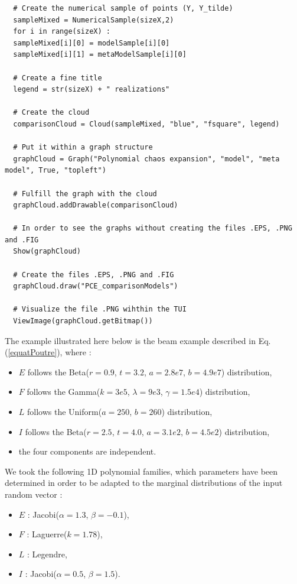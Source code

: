 \begin{lstlisting}
  # Create the numerical sample of points (Y, Y_tilde)
  sampleMixed = NumericalSample(sizeX,2)
  for i in range(sizeX) :
  sampleMixed[i][0] = modelSample[i][0]
  sampleMixed[i][1] = metaModelSample[i][0]

  # Create a fine title
  legend = str(sizeX) + " realizations"

  # Create the cloud
  comparisonCloud = Cloud(sampleMixed, "blue", "fsquare", legend)

  # Put it within a graph structure
  graphCloud = Graph("Polynomial chaos expansion", "model", "meta model", True, "topleft")

  # Fulfill the graph with the cloud
  graphCloud.addDrawable(comparisonCloud)

  # In order to see the graphs without creating the files .EPS, .PNG and .FIG
  Show(graphCloud)

  # Create the files .EPS, .PNG and .FIG
  graphCloud.draw("PCE_comparisonModels")

  # Visualize the file .PNG wihthin the TUI
  ViewImage(graphCloud.getBitmap())
\end{lstlisting}

\vspace*{0.1cm}

The example illustrated here below is the beam example described in Eq. (\ref{equatPoutre}), where :
\begin{itemize}
\item $E$ follows the Beta($r = 0.9$, $t = 3.2$, $a = 2.8e7$, $b = 4.9e7$) distribution,
\item $F$ follows the Gamma($k = 3e5$, $\lambda = 9e3$, $\gamma = 1.5e4$)  distribution,
\item $L$ follows the Uniform($a = 250$, $b=260$) distribution,
\item $I$ follows the Beta($r = 2.5$, $t = 4.0$, $a = 3.1e2$, $b = 4.5e2$) distribution,
\item the four components are independent.
\end{itemize}

We took the following 1D polynomial families, which parameters have been determined in order to be adapted to the marginal distributions of the input random vector :
\begin{itemize}
\item $E$ : Jacobi($\alpha = 1.3$, $\beta = -0.1$),
\item $F$ : Laguerre($k = 1.78$),
\item $L$ : Legendre,
\item $I$ : Jacobi($\alpha = 0.5$, $\beta = 1.5$).
\end{itemize}

